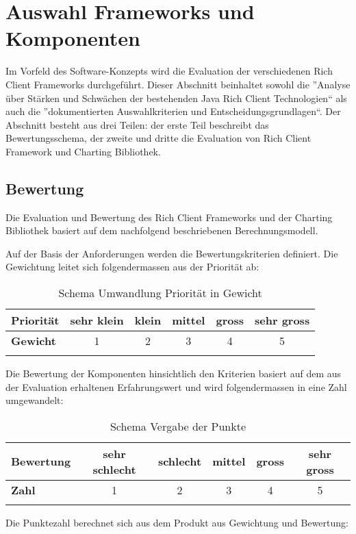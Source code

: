 \chapter{Auswahl Frameworks und Komponenten}\label{selection_rcp_fw}
Im Vorfeld des Software-Konzepts wird die Evaluation der verschiedenen Rich Client Frameworks durchgeführt. Dieser Abschnitt beinhaltet sowohl die ''Analyse über Stärken und Schwächen der bestehenden Java Rich Client Technologien`` als auch die ''dokumentierten Auswahlkriterien und Entscheidungsgrundlagen``. Der Abschnitt besteht aus drei Teilen: der erste Teil beschreibt das Bewertungsschema, der zweite und dritte die Evaluation von Rich Client Framework und Charting Bibliothek.


\section{Bewertung}
Die Evaluation und Bewertung des Rich Client Frameworks und der Charting Bibliothek basiert auf dem nachfolgend beschriebenen Berechnungsmodell. 

Auf der Basis der Anforderungen werden die Bewertungskriterien definiert. Die Gewichtung leitet sich folgendermassen aus der Priorität ab:
\begin{longtable}{|l|c|c|c|c|c|}\hline
 \textbf{Priorität} & sehr klein & klein & mittel & gross & sehr gross\\\hline
 \textbf{Gewicht} & 1 & 2 & 3 & 4 & 5\\\hline
 \caption{Schema Umwandlung Priorität in Gewicht}
\end{longtable}

Die Bewertung der Komponenten hinsichtlich den Kriterien basiert auf dem aus der Evaluation erhaltenen Erfahrungswert und wird folgendermassen in eine Zahl umgewandelt:
\begin{longtable}{|l|c|c|c|c|c|}\hline
 \textbf{Bewertung} & sehr schlecht & schlecht & mittel & gross & sehr gross\\\hline
 \textbf{Zahl} & 1 & 2 & 3 & 4 & 5\\\hline
 \caption{Schema Vergabe der Punkte}
\end{longtable}

Die Punktezahl berechnet sich aus dem Produkt aus Gewichtung und Bewertung:
\begin{center}
\end{center}
